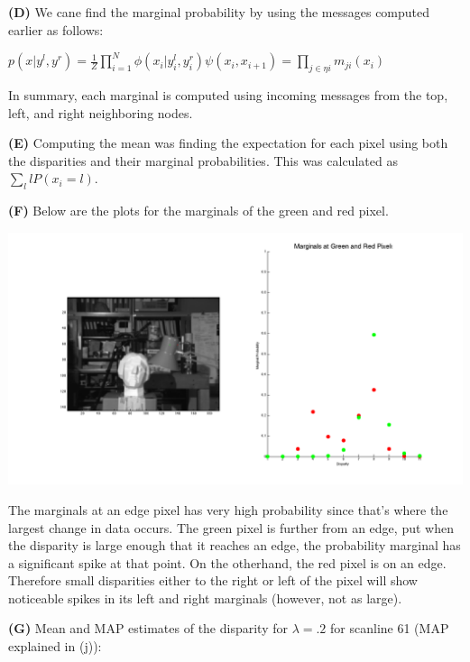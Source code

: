 \documentclass[12pt,twoside]{article}
\begin{document}
\textbf{(D)} We cane find the marginal probability by using the messages computed earlier as follows:
\newline
\begin{center}
$p(x|y^l, y^r) = \frac{1}{Z} \prod\limits_{i=1}^{N} \phi(x_{i}|y_{i}^{l}, y_{i}^{r}) \psi(x_{i}, x_{i+1}) = \prod\limits_{j \in \eta{i}} m_{ji}(x_i)$
\end{center}

In summary, each marginal is computed using incoming messages from the top, left, and right neighboring nodes.
\newline

\textbf{(E)} Computing the mean was finding the expectation for each pixel using both the disparities and their marginal probabilities.  This was calculated as $\sum\limits_{l} lP(x_i = l)$.  
\newline

\textbf{(F)} Below are the plots for the marginals of the green and red pixel.  
\newline

\hspace{-70pt}
    \includegraphics[scale=.4]{5_1d} 

The marginals at an edge pixel has very high probability since that's where the largest change in data occurs.  The green pixel is further from an edge, put when the disparity is large enough that it reaches an edge, the probability marginal has a significant spike at that point.  On the otherhand, the red pixel is on an edge.  Therefore small disparities either to the right or left of the pixel will show noticeable spikes in its left and right marginals (however, not as large).
\newline

\textbf{(G)} Mean and MAP estimates of the disparity for $\lambda = .2$ for scanline 61 (MAP explained in (j)):  
\newline 
\end{document}
